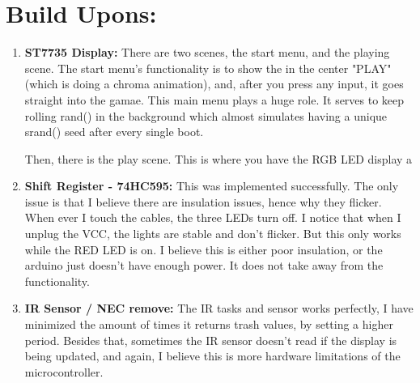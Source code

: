 \documentclass[12pt]{article}
\begin{document}
\section{Build Upons:}
\begin{enumerate}
  \item \textbf{ST7735 Display:}
    There are two scenes, the start menu, and the playing scene.
    The start menu's functionality is to show the in the center "PLAY"
    (which is doing a chroma animation),
    and, after you press any input, it goes straight into the gamae.
    This main menu plays a huge role. It serves to keep rolling rand()
    in the background which almost simulates having
    a unique srand() seed after every single boot.

    Then, there is the play scene. This is where you have the RGB LED
    display a
  \item \textbf{Shift Register - 74HC595:} This was implemented successfully.
    The only issue is that I believe there are insulation issues, hence why they flicker.
    When ever I touch the cables, the three LEDs turn off.
    I notice that when I unplug the VCC, the lights are stable and don't flicker.
    But this only works while the RED LED is on.
    I believe this is either poor insulation, or the arduino
    just doesn't have enough power. It does not take away from the functionality.
  \item \textbf{IR Sensor / NEC remove:}
    The IR tasks and sensor works perfectly,
    I have minimized the amount of times it returns trash values, by setting a higher
    period. Besides that, sometimes the IR sensor doesn't read if the display is being updated,
    and again, I believe this is more hardware limitations of the microcontroller.
\end{enumerate}

\pagebreak
\end{document}

